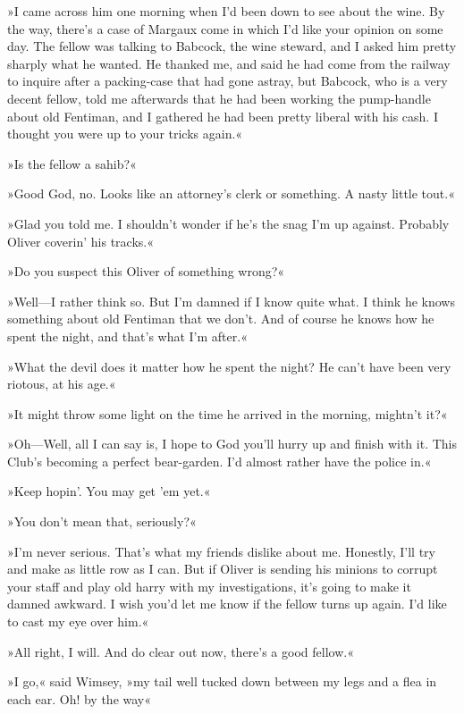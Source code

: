 »I came across him one morning when I'd been down to see about the wine. By the way, there's a case of Margaux come in which I'd like your opinion on some day. The fellow was talking to Babcock, the wine steward, and I asked him pretty sharply what he wanted. He thanked me, and said he had come from the railway to inquire after a packing-case that had gone astray, but Babcock, who is a very decent fellow, told me afterwards that he had been working the pump-handle about old Fentiman, and I gathered he had been pretty liberal with his cash. I thought you were up to your tricks again.«

»Is the fellow a sahib?«

»Good God, no. Looks like an attorney's clerk or something. A nasty little tout.«

»Glad you told me. I shouldn't wonder if he's the snag I'm up against. Probably Oliver coverin' his tracks.«

»Do you suspect this Oliver of something wrong?«

»Well\allowbreak---\allowbreak I rather think so. But I'm damned if I know quite what. I think he knows something about old Fentiman that we don't. And of course he knows how he spent the night, and that's what I'm after.«

»What the devil does it matter how he spent the night? He can't have been very riotous, at his age.«

»It might throw some light on the time he arrived in the morning, mightn't it?«

»Oh\allowbreak---\allowbreak Well, all I can say is, I hope to God you'll hurry up and finish with it. This Club's becoming a perfect bear-garden. I'd almost rather have the police in.«

»Keep hopin'. You may get 'em yet.«

»You don't mean that, seriously?«

»I'm never serious. That's what my friends dislike about me. Honestly, I'll try and make as little row as I can. But if Oliver is sending his minions to corrupt your staff and play old harry with my investigations, it's going to make it damned awkward. I wish you'd let me know if the fellow turns up again. I'd like to cast my eye over him.«

»All right, I will. And do clear out now, there's a good fellow.«

»I go,« said Wimsey, »my tail well tucked down between my legs and a flea in each ear. Oh! by the way\longdash«

